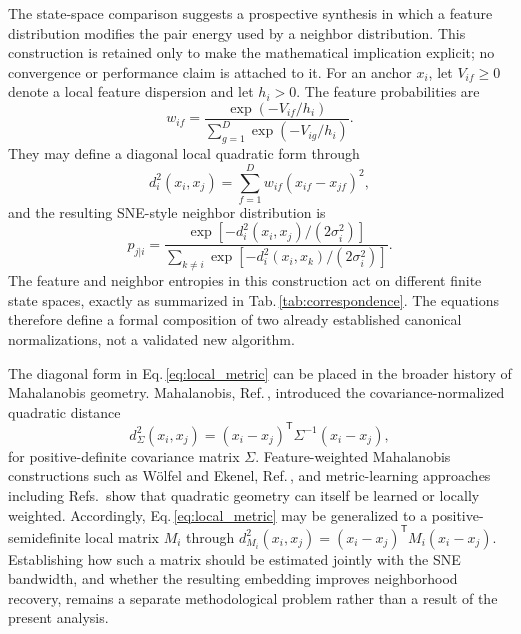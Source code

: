 \documentclass[11pt,a4paper]{article}
\theoremstyle{definition}
\theoremstyle{plain}
\begin{document}
\label{sec:dual}

The state-space comparison suggests a prospective synthesis in which a feature distribution modifies the pair energy used by a neighbor distribution. This construction is retained only to make the mathematical implication explicit; no convergence or performance claim is attached to it. For an anchor $x_i$, let $V_{if}\ge0$ denote a local feature dispersion and let $h_i>0$. The feature probabilities are
\begin{equation}
    w_{if}
    =\frac{\exp\left(-V_{if}/h_i\right)}
    {\sum_{g=1}^{D}\exp\left(-V_{ig}/h_i\right)}.
    \label{eq:pointwise_feature_weights}
\end{equation}
They may define a diagonal local quadratic form through
\begin{equation}
    d_i^2(x_i,x_j)
    =\sum_{f=1}^{D}w_{if}(x_{if}-x_{jf})^2,
    \label{eq:local_metric}
\end{equation}
and the resulting SNE-style neighbor distribution is
\begin{equation}
    p_{j|i}
    =\frac{\exp\left[-d_i^2(x_i,x_j)/(2\sigma_i^2)\right]}
    {\sum_{k\ne i}\exp\left[-d_i^2(x_i,x_k)/(2\sigma_i^2)\right]}.
    \label{eq:locally_adaptive_sne}
\end{equation}
The feature and neighbor entropies in this construction act on different finite state spaces, exactly as summarized in Tab.\,\ref{tab:correspondence}. The equations therefore define a formal composition of two already established canonical normalizations, not a validated new algorithm.

The diagonal form in Eq.\,\eqref{eq:local_metric} can be placed in the broader history of Mahalanobis geometry. Mahalanobis, Ref.\,\cite{mahalanobis1936}, introduced the covariance-normalized quadratic distance
\begin{equation}
    d_{\Sigma}^{2}(x_i,x_j)
    =(x_i-x_j)^{\mathsf T}\Sigma^{-1}(x_i-x_j),
    \label{eq:classical_mahalanobis}
\end{equation}
for positive-definite covariance matrix $\Sigma$. Feature-weighted Mahalanobis constructions such as W\"olfel and Ekenel, Ref.\,\cite{wolfel2005fwmd}, and metric-learning approaches including Refs.\,\cite{xing2002metric,goldberger2004nca,davis2007itml,weinberger2009lmnn} show that quadratic geometry can itself be learned or locally weighted. Accordingly, Eq.\,\eqref{eq:local_metric} may be generalized to a positive-semidefinite local matrix $M_i$ through $d_{M_i}^2(x_i,x_j)=(x_i-x_j)^{\mathsf T}M_i(x_i-x_j)$. Establishing how such a matrix should be estimated jointly with the SNE bandwidth, and whether the resulting embedding improves neighborhood recovery, remains a separate methodological problem rather than a result of the present analysis.
\end{document}
